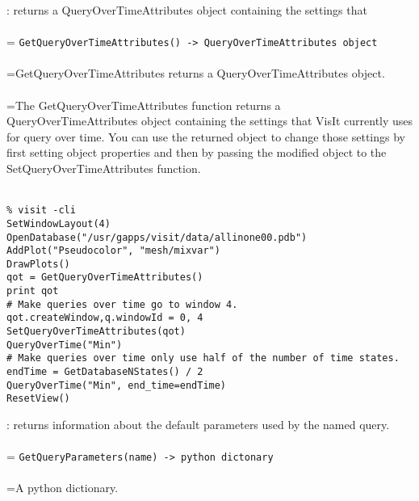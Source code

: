 \documentclass[10pt,a4paper]{report}
\begin{document}
{}
: returns a QueryOverTimeAttributes object containing the settings that\\[-3mm]

 \\ 
\hangindent=\parindent 
\verb!GetQueryOverTimeAttributes() -> QueryOverTimeAttributes object!\\ [-3mm]

 \\ 
\hangindent=\parindent GetQueryOverTimeAttributes returns a QueryOverTimeAttributes object. \\[-3mm] 

 \\ 
\hangindent=\parindent The GetQueryOverTimeAttributes function returns a QueryOverTimeAttributes object containing the settings that VisIt currently uses for query over time. You can use the returned object to change those settings by first setting object properties and then by passing the modified object to the SetQueryOverTimeAttributes function. \\[-3mm] 

\\[-6mm]
\begin{verbatim}% visit -cli
SetWindowLayout(4)
OpenDatabase("/usr/gapps/visit/data/allinone00.pdb")
AddPlot("Pseudocolor", "mesh/mixvar")
DrawPlots()
qot = GetQueryOverTimeAttributes()
print qot
# Make queries over time go to window 4.
qot.createWindow,q.windowId = 0, 4
SetQueryOverTimeAttributes(qot)
QueryOverTime("Min")
# Make queries over time only use half of the number of time states.
endTime = GetDatabaseNStates() / 2
QueryOverTime("Min", end_time=endTime)
ResetView()
\end{verbatim}
\newpage


{}
: returns information about the default parameters used by the named query.\\[-3mm]

 \\ 
\hangindent=\parindent 
\verb!GetQueryParameters(name) -> python dictonary!\\ [-3mm]

 \\ 
\hangindent=\parindent A python dictionary. \\[-3mm] 
\end{document}
